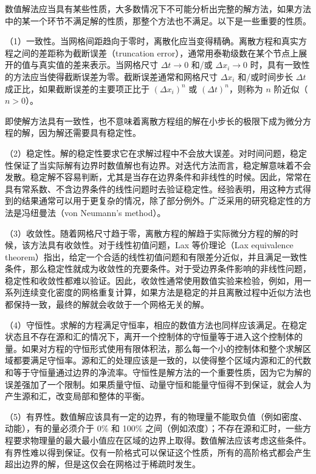 数值解法应当具有某些性质，大多数情况下不可能分析出完整的解方法，如果方法中的某一个环节不满足解的性质，那整个方法也不满足。以下是一些重要的性质。

（1）一致性。当网格间距趋向于零时，离散化应当变得精确。离散方程和真实方程之间的差距称为截断误差（truncation error），通常用泰勒级数在某个节点上展开的值与真实值的差来表示。当网格尺寸 $\Delta t \to 0$ 和/或 $\Delta x_i \to 0$ 时，具有一致性的方法应当使得截断误差为零。截断误差通常和网格尺寸 $\Delta x_i$ 和/或时间步长 $\Delta t$ 成正比，如果截断误差的主要项正比于 $(\Delta x_i)^n$ 或 $(\Delta t)^n$，则称为 $n$ 阶近似（$n>0$）。%

即使解方法具有一致性，也不意味着离散方程组的解在小步长的极限下成为微分方程的解，因为解还需要具有稳定性。

（2）稳定性。解的稳定性要求它在求解过程中不会放大误差。对时间问题，稳定性保证了当实际解有边界时数值解也有边界。对迭代方法而言，稳定解意味着不会发散。稳定解不容易判断，尤其是当存在边界条件和非线性的时候。因此，常常在具有常系数、不含边界条件的线性问题时去验证稳定性。经验表明，用这种方式得到的结果通常可以用于更复杂的情况，除了部分例外。广泛采用的研究稳定性的方法是冯纽曼法（von Neumann's method）。

（3）收敛性。随着网格尺寸趋于零，离散方程的解趋于实际微分方程的解的时候，该方法具有收敛性。对于线性初值问题，Lax 等价理论（Lax equivalence theorem）\cite{Richtmyer1967}指出，给定一个合适的线性初值问题和有限差分近似，并且满足一致性条件，那么稳定性就成为收敛性的充要条件。对于受边界条件影响的非线性问题，稳定性和收敛性都难以验证。因此，收敛性通常使用数值实验来检验，例如，用一系列连续变化密度的网格重复计算，如果方法是稳定的并且离散过程中近似方法也都保持一致，最终的解就会收敛于一个网格无关的解。

（4）守恒性。求解的方程满足守恒率，相应的数值方法也同样应该满足。在稳定状态且不存在源和汇的情况下，离开一个控制体的守恒量等于进入这个控制体的量。如果对方程的守恒形式使用有限体积法，那么每一个小的控制体和整个求解区域都要满足守恒率。源和汇的处理应该是一致的，以使得整个区域内源和汇的代数和等于守恒量通过边界的净流率。守恒性是解方法的一个重要性质，因为它为解的误差强加了一个限制。如果质量守恒、动量守恒和能量守恒得不到保证，就会人为产生源和汇，改变局部和整体的平衡。

（5）有界性。数值解应该具有一定的边界，有的物理量不能取负值（例如密度、动能），有的量必须介于 0\% 和 100\% 之间（例如浓度）；不存在源和汇时，一些方程要求物理量的最大最小值应在区域的边界上取得。数值解法应该考虑这些条件。有界性难以得到保证。仅有一阶格式可以保证这个性质，所有的高阶格式都会产生超出边界的解，但是这仅会在网格过于稀疏时发生。

